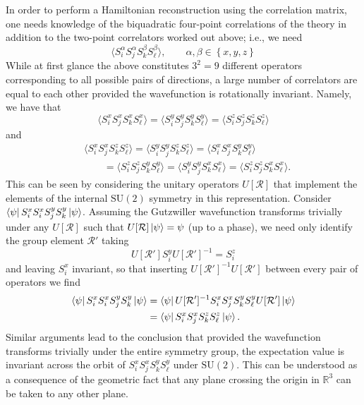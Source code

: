 \documentclass{report}
\begin{document}
In order to perform a Hamiltonian reconstruction using the correlation matrix, 
one needs knowledge of the biquadratic four-point correlations of the theory 
in addition to the two-point correlators worked out above; i.e., we need 
\begin{equation*}
	\langle S_i^\alpha S_j^\alpha S_k^\beta S_\ell^\beta \rangle,\qquad 
		\alpha,\beta \in \left\{x,y,z\right\}
\end{equation*}
While at first glance the above constitutes $ 3^2 = 9 $ different operators 
corresponding to all possible pairs of directions, a large number of correlators 
are equal to each other provided the wavefunction is rotationally invariant. 
Namely, we have that 
\begin{equation*}
	\langle S_i^x S_j^x S_k^x S_\ell^x \rangle = 
	\langle S_i^y S_j^y S_k^y S_\ell^y \rangle = 
	\langle S_i^z S_j^z S_k^z S_\ell^z \rangle
\end{equation*}
and 
\begin{align*}
	&\langle S_i^x S_j^x S_k^z S_\ell^z \rangle = 
	\langle S_i^y S_j^y S_k^z S_\ell^z \rangle = 
	\langle S_i^x S_j^x S_k^y S_\ell^y \rangle\\
	&\qquad =\langle S_i^z S_j^z S_k^y S_\ell^y \rangle = 
	\langle S_i^y S_j^y S_k^x S_\ell^x \rangle = 
	\langle S_i^z S_j^z S_k^x S_\ell^x \rangle.
\end{align*}
This can be seen by considering the unitary operators $ U[\mathcal{R}] $
that implement the elements of the internal $ \text{SU}(2) $ symmetry in
this representation. 
Consider $ \bra{\psi} S_i^x S_i^x S_j^y S_k^y \ket{\psi} $.
Assuming the Gutzwiller wavefunction transforms trivially under any 
$ U[\mathcal{R}] $ such that $ U[\mathcal{R}]\ket{\psi} = \psi $ (up to a phase), 
we need only identify the group element $ \mathcal{R}' $ taking
\begin{equation*}
	U[\mathcal{R}'] S_i^y U[\mathcal{R}']^{-1}
		= S_i^z
\end{equation*}
and leaving $ S_i^x $ invariant, 
so that inserting $ U[\mathcal{R}']^{-1}  U[\mathcal{R}']$ between every pair 
of operators we find
\begin{align*}
	\bra{\psi} S_i^x S_i^x S_j^y S_k^y \ket{\psi}
		&= 
	\bra{\psi}U[\mathcal{R}']^{-1} S_i^x S_j^x S_k^y S_\ell^y U[\mathcal{R}']\ket{\psi}\\
		&=\bra{\psi} S_i^x S_j^x S_k^z S_\ell^z \ket{\psi}.
\end{align*}
Similar arguments lead to the conclusion that provided the wavefunction transforms 
trivially under the entire symmetry group, the expectation value is invariant 
across the orbit of $ S_i^x S_j^x S_k^y S_\ell^y $ under $ \text{SU}(2) $.
This can be understood as a consequence of the geometric fact that any plane
crossing the origin in $ \mathbb{R}^3 $ can be taken to any other plane.
\end{document}

